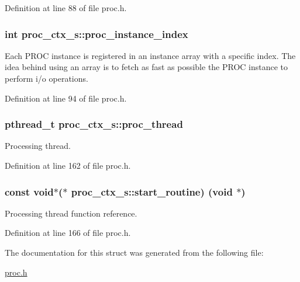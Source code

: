 Definition at line 88 of file proc.\+h.

\subsubsection[{\texorpdfstring{proc\+\_\+instance\+\_\+index}{proc_instance_index}}]{\setlength{\rightskip}{0pt plus 5cm}int proc\+\_\+ctx\+\_\+s\+::proc\+\_\+instance\+\_\+index}\hypertarget{structproc__ctx__s_a3912d4b5eaffcdaefa00f149ca4a8c63}{}\label{structproc__ctx__s_a3912d4b5eaffcdaefa00f149ca4a8c63}
Each P\+R\+OC instance is registered in an instance array with a specific index. The idea behind using an array is to fetch as fast as possible the P\+R\+OC instance to perform i/o operations. 

Definition at line 94 of file proc.\+h.

\subsubsection[{\texorpdfstring{proc\+\_\+thread}{proc_thread}}]{\setlength{\rightskip}{0pt plus 5cm}pthread\+\_\+t proc\+\_\+ctx\+\_\+s\+::proc\+\_\+thread}\hypertarget{structproc__ctx__s_a09ad60355584215cfeb4d5589ee390b9}{}\label{structproc__ctx__s_a09ad60355584215cfeb4d5589ee390b9}
Processing thread. 

Definition at line 162 of file proc.\+h.

\subsubsection[{\texorpdfstring{start\+\_\+routine}{start_routine}}]{\setlength{\rightskip}{0pt plus 5cm}const void$\ast$($\ast$ proc\+\_\+ctx\+\_\+s\+::start\+\_\+routine) (void $\ast$)}\hypertarget{structproc__ctx__s_a1149ce1c28aae8e553c85125e30be661}{}\label{structproc__ctx__s_a1149ce1c28aae8e553c85125e30be661}
Processing thread function reference. 

Definition at line 166 of file proc.\+h.



The documentation for this struct was generated from the following file\+:\begin{DoxyCompactItemize}
\item 
\hyperlink{proc_8h}{proc.\+h}\end{DoxyCompactItemize}
